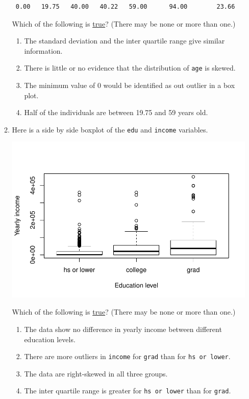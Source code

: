 \documentclass[12pt,fullpage]{amsart}
\begin{document}
\begin{enumerate}
\begin{enumerate}
\begin{verbatim}
 0.00   19.75   40.00   40.22   59.00      94.00        23.66
\end{verbatim}
Which of the following is \underline{true}? (There may be none or more than one.)
\begin{enumerate}
    \item
      The standard deviation and the inter quartile range give similar information.
    \item
    There is little or no evidence that the distribution of \texttt{age} is skewed.
    \item
    The minimum value of 0 would be identified as out outlier in a box plot.
    \item
    Half of the individuals are between 19.75 and 59 years old.
      
\end{enumerate}


\item Here is a side by side boxplot of the \texttt{edu} and \texttt{income} variables.

\includegraphics[scale=0.45]{eduIncome}

Which of the following is \underline{true}? (There may be none or more than one.)

\begin{enumerate}
\item The data show no difference in yearly income between different education levels.
\item There are more outliers in \texttt{income} for \texttt{grad} than for \texttt{hs or lower}.
\item The data are right-skewed in all three groups.
\item The inter quartile range is greater for \texttt{hs or lower} than for \texttt{grad}.
\end{enumerate}


\end{enumerate}
\end{enumerate}
\end{document}
